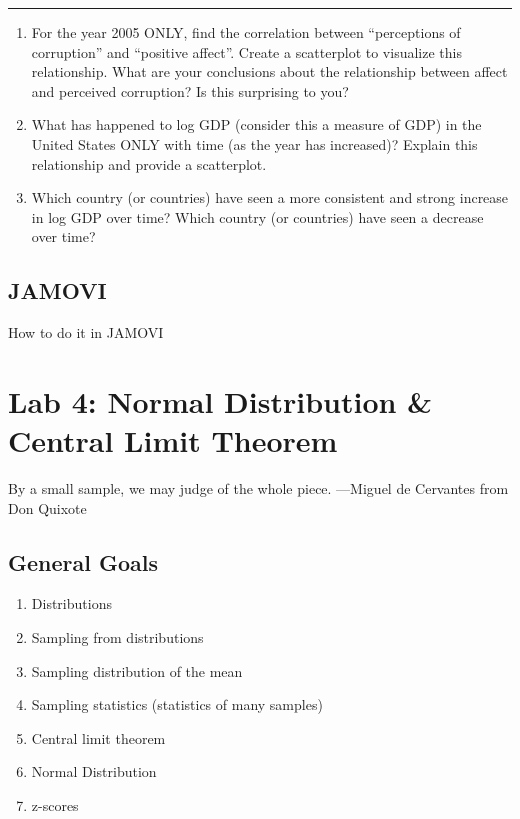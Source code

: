 \documentclass[]{book}
\providecommand{\tightlist}{%
  \setlength{\itemsep}{0pt}\setlength{\parskip}{0pt}}
\begin{document}
\begin{center}\rule{0.5\linewidth}{0.5pt}\end{center}

\begin{enumerate}
\def\labelenumi{\arabic{enumi}.}
\item
  For the year 2005 ONLY, find the correlation between ``perceptions of
  corruption'' and ``positive affect''. Create a scatterplot to
  visualize this relationship. What are your conclusions about the
  relationship between affect and perceived corruption? Is this
  surprising to you?
\item
  What has happened to log GDP (consider this a measure of GDP) in the
  United States ONLY with time (as the year has increased)? Explain this
  relationship and provide a scatterplot.
\item
  Which country (or countries) have seen a more consistent and strong
  increase in log GDP over time? Which country (or countries) have seen
  a decrease over time?
\end{enumerate}

\section{JAMOVI}\label{jamovi-3}

How to do it in JAMOVI

\chapter{Lab 4: Normal Distribution \& Central Limit
Theorem}\label{lab-4-normal-distribution-central-limit-theorem}

{ By a small sample, we may judge of the whole piece. ---Miguel de
Cervantes from Don Quixote }

\section{General Goals}\label{general-goals-3}

\begin{enumerate}
\def\labelenumi{\arabic{enumi}.}
\tightlist
\item
  Distributions
\item
  Sampling from distributions
\item
  Sampling distribution of the mean
\item
  Sampling statistics (statistics of many samples)
\item
  Central limit theorem
\item
  Normal Distribution
\item
  z-scores
\end{enumerate}
\end{document}
